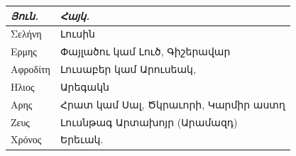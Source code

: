 \documentclass{article}
\begin{document}
\begin{table}[H]
    \centering
    \arm
    \small
    \begin{tabular}{l l}
        \emph{Յուն.}   &  \emph{Հայկ.}                              \\ \hline
         Σελήνη    &  Լուսին                               \\ 
         Ερμης     &  Փայլածու կամ Լուծ, Գիշերավար         \\
         Αφροδίτη  &  Լուսաբեր կամ Արուսեակ,               \\
         Ηλιος     &  Արեգակն                              \\
         Αρης      &  Հրատ կամ Սալ, Ծկրաւորի, Կարմիր աստղ  \\
         Ζευς      &  Լուսնթագ Արտախոյր (Արամազդ)          \\
         Χρόνος    &  Երեւակ. \\
    \end{tabular}
\end{table}
\end{document}
